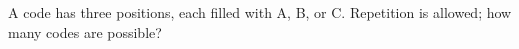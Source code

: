 A code has three positions, each filled with A, B, or C. Repetition is allowed; how many codes are possible?
